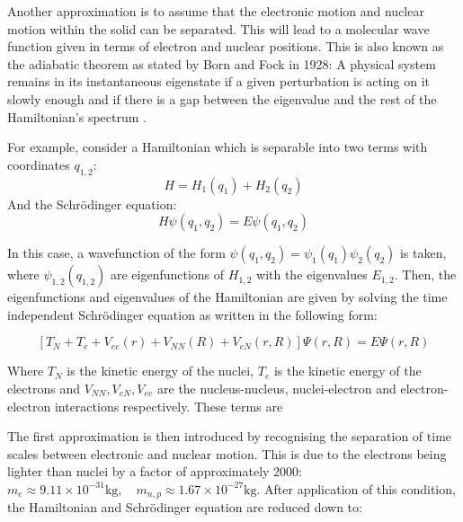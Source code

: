 Another approximation is to assume that the electronic motion and nuclear motion within the solid can be separated. This will lead to a molecular wave function given in terms of electron and nuclear positions. This is also known as the adiabatic theorem as stated by Born and Fock in 1928: A physical system remains in its instantaneous eigenstate if a given perturbation is acting on it slowly enough and if there is a gap between the eigenvalue and the rest of the Hamiltonian's spectrum \cite{born1928}. 

For example, consider a Hamiltonian which is separable into two terms with coordinates $q_{1,2}$:
\begin{equation}
    H=H_{1}\left(q_{1}\right) + H_{2}\left(q_{2}\right)
    \label{eq:hamiltonian_seperable12}
\end{equation}
And the Schr{\"o}dinger equation:
\begin{equation}
    H\psi\left(q_{1},q_{2}\right) = E\psi\left(q_{1},q_{2}\right)
    \label{eq:schrodinger_seperable}
\end{equation}

In this case, a wavefunction of the form $\psi\left(q_{1},q_{2}\right) = \psi_{1}\left(q_{1}\right)\psi_{2}\left(q_{2}\right)$ is taken, where $\psi_{1,2}\left(q_{1,2}\right)$ are eigenfunctions of $H_{1,2}$ with the eigenvalues $E_{1,2}$. Then, the eigenfunctions and eigenvalues of the Hamiltonian are given by solving the time independent Schr{\"o}dinger equation as written in the following form:

\begin{equation}
    \left[T_{N} + T_{e} + V_{ee}\left(r\right) + V_{NN}\left(R\right) + V_{eN}\left(r,R\right)\right]\Psi\left(r,R\right) = E\Psi\left(r,R\right)
    \label{eq:TISE_hartree_fock}
\end{equation}

Where $T_{N}$ is the kinetic energy of the nuclei, $T_{e}$ is the kinetic energy of the electrons and $V_{NN},V_{eN},V_{ee}$ are the nucleus-nucleus, nuclei-electron and electron-electron interactions respectively. These terms are 

The first approximation is then introduced by recognising the separation of time scales between electronic and nuclear motion. This is due to the electrons being lighter than nuclei by a factor of approximately 2000: $m_{e}\approx9.11\times10^{-31}\si{\kilogram}, \quad m_{n,p}\approx1.67\times10^{-27}\si{\kilogram}$. After application of this condition, the Hamiltonian and Schr{\"o}dinger equation are reduced down to:

